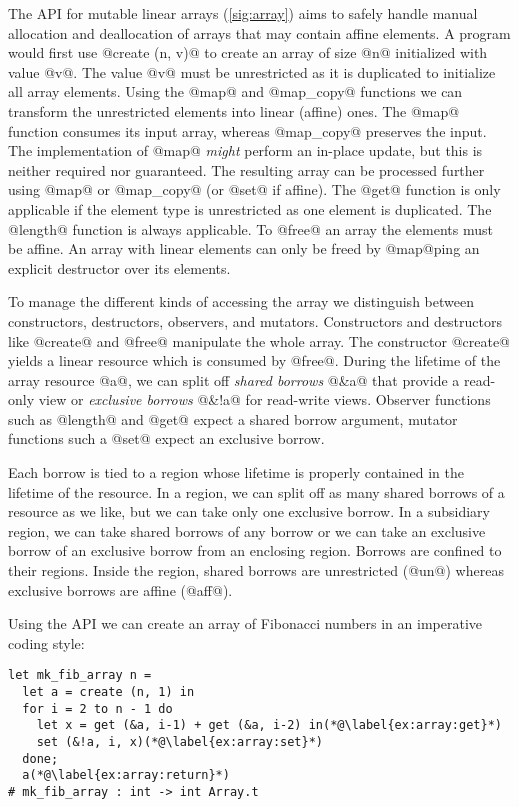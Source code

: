 The API for mutable linear arrays (\cref{sig:array})
aims to safely handle manual allocation and
deallocation of arrays that may contain affine elements.
A program would first use @create (n, v)@ to create
an array of size @n@ initialized with value
@v@. The value @v@ must be unrestricted as it is duplicated to
initialize all array elements. Using the @map@ and @map_copy@ functions we
can transform the unrestricted elements into linear (affine)
ones. The @map@ function consumes its input array, whereas @map_copy@
preserves the input. The implementation of @map@ \emph{might} perform
an in-place update, but this is neither required nor guaranteed. The
resulting array can be processed further using @map@ or 
@map_copy@ (or @set@ if affine). The @get@ function is only applicable
if the element type is unrestricted as one element is duplicated. The @length@
function is always applicable. To @free@ an array the elements must be
affine. An array with linear elements can only be freed by @map@ping
an explicit destructor over its elements.

To manage the different kinds of accessing the array we distinguish between constructors, destructors,
observers, and mutators.
Constructors and destructors like @create@ and @free@ manipulate the whole
array. %
The constructor
@create@ yields a linear resource which is consumed by @free@.
During the lifetime of the array resource @a@, we can split
off \emph{shared borrows} @&a@ that provide a read-only
view or \emph{exclusive borrows} @&!a@ for read-write views.
Observer functions such as @length@ and @get@ expect a shared borrow
argument, mutator functions such a @set@ expect
an exclusive borrow.

Each borrow is tied to a region whose lifetime is properly
contained in the lifetime of the resource.
In a region, we can split off as many shared borrows of a resource as
we like, but we can take only one exclusive borrow. In a
subsidiary region, we can take shared borrows of any
borrow or we can take an exclusive borrow of an exclusive borrow from an
enclosing region. Borrows are confined to their regions. Inside the region,
shared borrows are unrestricted (@un@) whereas exclusive
borrows are affine (@aff@).

Using the API 
we can create an
array of Fibonacci numbers in an imperative coding style:
\begin{lstlisting}
let mk_fib_array n =
  let a = create (n, 1) in
  for i = 2 to n - 1 do
    let x = get (&a, i-1) + get (&a, i-2) in(*@\label{ex:array:get}*)
    set (&!a, i, x)(*@\label{ex:array:set}*)
  done;
  a(*@\label{ex:array:return}*)
# mk_fib_array : int -> int Array.t
\end{lstlisting}

